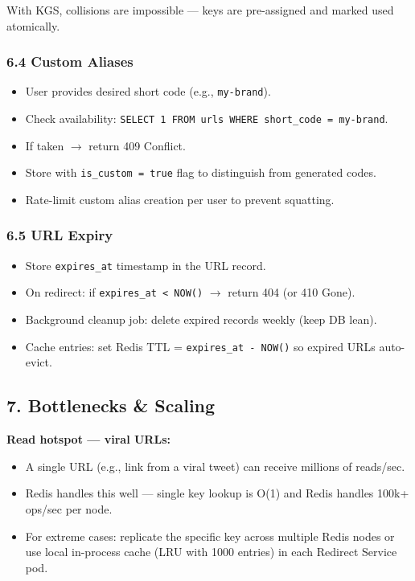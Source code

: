 \documentclass[11pt]{article}
\providecommand{\tightlist}{\setlength{\itemsep}{1pt}\setlength{\parskip}{0pt}}
\begin{document}
With KGS, collisions are impossible --- keys are pre-assigned and marked used atomically.

\subsubsection{6.4 Custom Aliases}\label{64-custom-aliases}

\begin{itemize}
\tightlist
\item
  User provides desired short code (e.g., \texttt{my-brand}).
\item
  Check availability: \texttt{SELECT\ 1\ FROM\ urls\ WHERE\ short\_code\ =\ \textquotesingle{}my-brand\textquotesingle{}}.
\item
  If taken \(\rightarrow\) return 409 Conflict.
\item
  Store with \texttt{is\_custom\ =\ true} flag to distinguish from generated codes.
\item
  Rate-limit custom alias creation per user to prevent squatting.
\end{itemize}

\subsubsection{6.5 URL Expiry}\label{65-url-expiry}

\begin{itemize}
\tightlist
\item
  Store \texttt{expires\_at} timestamp in the URL record.
\item
  On redirect: if \texttt{expires\_at\ \textless{}\ NOW()} \(\rightarrow\) return 404 (or 410 Gone).
\item
  Background cleanup job: delete expired records weekly (keep DB lean).
\item
  Cache entries: set Redis TTL = \texttt{expires\_at\ -\ NOW()} so expired URLs auto-evict.
\end{itemize}

\subsection{7. Bottlenecks \& Scaling}\label{7-bottlenecks--scaling}

\textbf{Read hotspot --- viral URLs:}

\begin{itemize}
\tightlist
\item
  A single URL (e.g., link from a viral tweet) can receive millions of reads/sec.
\item
  Redis handles this well --- single key lookup is O(1) and Redis handles 100k+ ops/sec per node.
\item
  For extreme cases: replicate the specific key across multiple Redis nodes or use local in-process cache (LRU with 1000 entries) in each Redirect Service pod.
\end{itemize}
\end{document}
